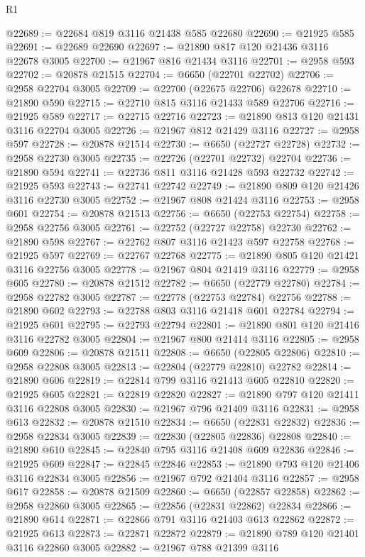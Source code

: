 \begin{lexlean}{R1}
\begin{coremodule}
@22689 := @22684 @819 @3116 @21438 @585 @22680
@22690 := @21925 @585
@22691 := @22689 @22690
@22697 := @21890 @817 @120 @21436 @3116 @22678 @3005
@22700 := @21967 @816 @21434 @3116
@22701 := @2958 @593
@22702 := @20878 @21515
@22704 := @6650 (@22701 @22702)
@22706 := @2958 @22704 @3005
@22709 := @22700 (@22675 @22706) @22678
@22710 := @21890 @590
@22715 := @22710 @815 @3116 @21433 @589 @22706
@22716 := @21925 @589
@22717 := @22715 @22716
@22723 := @21890 @813 @120 @21431 @3116 @22704 @3005
@22726 := @21967 @812 @21429 @3116
@22727 := @2958 @597
@22728 := @20878 @21514
@22730 := @6650 (@22727 @22728)
@22732 := @2958 @22730 @3005
@22735 := @22726 (@22701 @22732) @22704
@22736 := @21890 @594
@22741 := @22736 @811 @3116 @21428 @593 @22732
@22742 := @21925 @593
@22743 := @22741 @22742
@22749 := @21890 @809 @120 @21426 @3116 @22730 @3005
@22752 := @21967 @808 @21424 @3116
@22753 := @2958 @601
@22754 := @20878 @21513
@22756 := @6650 (@22753 @22754)
@22758 := @2958 @22756 @3005
@22761 := @22752 (@22727 @22758) @22730
@22762 := @21890 @598
@22767 := @22762 @807 @3116 @21423 @597 @22758
@22768 := @21925 @597
@22769 := @22767 @22768
@22775 := @21890 @805 @120 @21421 @3116 @22756 @3005
@22778 := @21967 @804 @21419 @3116
@22779 := @2958 @605
@22780 := @20878 @21512
@22782 := @6650 (@22779 @22780)
@22784 := @2958 @22782 @3005
@22787 := @22778 (@22753 @22784) @22756
@22788 := @21890 @602
@22793 := @22788 @803 @3116 @21418 @601 @22784
@22794 := @21925 @601
@22795 := @22793 @22794
@22801 := @21890 @801 @120 @21416 @3116 @22782 @3005
@22804 := @21967 @800 @21414 @3116
@22805 := @2958 @609
@22806 := @20878 @21511
@22808 := @6650 (@22805 @22806)
@22810 := @2958 @22808 @3005
@22813 := @22804 (@22779 @22810) @22782
@22814 := @21890 @606
@22819 := @22814 @799 @3116 @21413 @605 @22810
@22820 := @21925 @605
@22821 := @22819 @22820
@22827 := @21890 @797 @120 @21411 @3116 @22808 @3005
@22830 := @21967 @796 @21409 @3116
@22831 := @2958 @613
@22832 := @20878 @21510
@22834 := @6650 (@22831 @22832)
@22836 := @2958 @22834 @3005
@22839 := @22830 (@22805 @22836) @22808
@22840 := @21890 @610
@22845 := @22840 @795 @3116 @21408 @609 @22836
@22846 := @21925 @609
@22847 := @22845 @22846
@22853 := @21890 @793 @120 @21406 @3116 @22834 @3005
@22856 := @21967 @792 @21404 @3116
@22857 := @2958 @617
@22858 := @20878 @21509
@22860 := @6650 (@22857 @22858)
@22862 := @2958 @22860 @3005
@22865 := @22856 (@22831 @22862) @22834
@22866 := @21890 @614
@22871 := @22866 @791 @3116 @21403 @613 @22862
@22872 := @21925 @613
@22873 := @22871 @22872
@22879 := @21890 @789 @120 @21401 @3116 @22860 @3005
@22882 := @21967 @788 @21399 @3116

\end{coremodule}
\end{lexlean}
